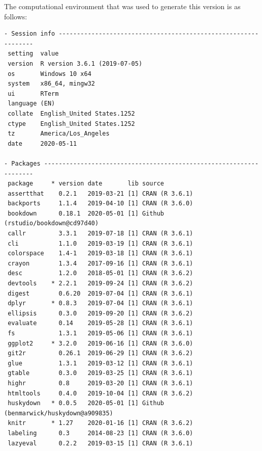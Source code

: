 \documentclass [11pt, proquest] {uwthesis}[2015/03/03]
\begin{document}
The computational environment that was used to generate this version is
as follows:
\begin{verbatim}
- Session info ---------------------------------------------------------------
 setting  value                       
 version  R version 3.6.1 (2019-07-05)
 os       Windows 10 x64              
 system   x86_64, mingw32             
 ui       RTerm                       
 language (EN)                        
 collate  English_United States.1252  
 ctype    English_United States.1252  
 tz       America/Los_Angeles         
 date     2020-05-11                  

- Packages -------------------------------------------------------------------
 package     * version date       lib source                               
 assertthat    0.2.1   2019-03-21 [1] CRAN (R 3.6.1)                       
 backports     1.1.4   2019-04-10 [1] CRAN (R 3.6.0)                       
 bookdown      0.18.1  2020-05-01 [1] Github (rstudio/bookdown@cd97d40)    
 callr         3.3.1   2019-07-18 [1] CRAN (R 3.6.1)                       
 cli           1.1.0   2019-03-19 [1] CRAN (R 3.6.1)                       
 colorspace    1.4-1   2019-03-18 [1] CRAN (R 3.6.1)                       
 crayon        1.3.4   2017-09-16 [1] CRAN (R 3.6.1)                       
 desc          1.2.0   2018-05-01 [1] CRAN (R 3.6.2)                       
 devtools    * 2.2.1   2019-09-24 [1] CRAN (R 3.6.2)                       
 digest        0.6.20  2019-07-04 [1] CRAN (R 3.6.1)                       
 dplyr       * 0.8.3   2019-07-04 [1] CRAN (R 3.6.1)                       
 ellipsis      0.3.0   2019-09-20 [1] CRAN (R 3.6.2)                       
 evaluate      0.14    2019-05-28 [1] CRAN (R 3.6.1)                       
 fs            1.3.1   2019-05-06 [1] CRAN (R 3.6.1)                       
 ggplot2     * 3.2.0   2019-06-16 [1] CRAN (R 3.6.0)                       
 git2r         0.26.1  2019-06-29 [1] CRAN (R 3.6.2)                       
 glue          1.3.1   2019-03-12 [1] CRAN (R 3.6.1)                       
 gtable        0.3.0   2019-03-25 [1] CRAN (R 3.6.1)                       
 highr         0.8     2019-03-20 [1] CRAN (R 3.6.1)                       
 htmltools     0.4.0   2019-10-04 [1] CRAN (R 3.6.2)                       
 huskydown   * 0.0.5   2020-05-01 [1] Github (benmarwick/huskydown@a909835)
 knitr       * 1.27    2020-01-16 [1] CRAN (R 3.6.2)                       
 labeling      0.3     2014-08-23 [1] CRAN (R 3.6.0)                       
 lazyeval      0.2.2   2019-03-15 [1] CRAN (R 3.6.1)                       

\end{verbatim}
\end{document}
